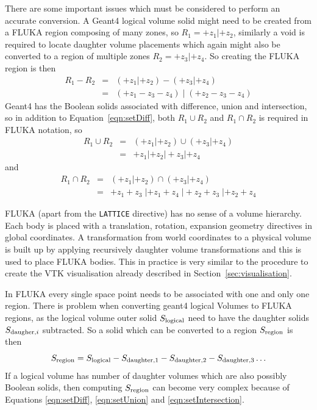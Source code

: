 \documentclass[final,5p,times,twocolumn]{elsarticle}
\newcommand{\fluka}[1]{\texttt{\MakeUppercase{#1}}}
\begin{document}
There are some important issues which must be considered to perform an accurate conversion. 
A Geant4 logical volume solid might need to be created from a FLUKA region composing of many zones, 
so $R_1 = +z_1 | +z_2$, similarly a void is required to locate daughter volume placements which again 
might also be converted to a region of multiple zones $R_2= +z_3 | +z_4$. So creating the FLUKA region is then 
\begin{eqnarray}
R_1 - R_2 	& = & (+z_1 | +z_2) - ( +z_3 | +z_4) 			\\
			& = & (+z_1 - z_3 - z_4) \;  | \; (+z_2 - z_3 - z_4)	
\label{eqn:setDiff}
\end{eqnarray}
Geant4 has the Boolean solids associated with difference, union and intersection, so in addition to 
Equation~\ref{eqn:setDiff}, both $R_1 \cup R_2$ and $R_1 \cap R_2$ is required in FLUKA notation, so 
\begin{eqnarray}
R_1 \cup R_2 	& = & (+z_1 | +z_2)  \cup ( +z_3 | +z_4) \\
			& = & +z_1 | +z_2 |  +z_3 | +z_4
\label{eqn:setUnion}
\end{eqnarray}
and 
\begin{eqnarray}
R_1 \cap R_2 	& = & (+z_1 | +z_2) \cap ( +z_3 | +z_4) \\
			& = & +z_1 +z_3  \; | +z_1 +z_4 \; | +z_2 +z_3 \; | +z_2 +z_4
\label{eqn:setIntersection}
\end{eqnarray}

FLUKA (apart from the \fluka{lattice} directive) has no sense of a volume hierarchy. Each body is placed with a 
translation, rotation, expansion geometry directives in global coordinates. A transformation from world 
coordinates to a physical volume is built up by applying recursively daughter volume transformations 
and  this is used to place FLUKA bodies. This  in practice is very similar to the procedure to create the 
VTK visualisation already described in Section~\ref{sec:visualisation}.

In FLUKA every single space point needs to be associated with one and only one region. There is problem 
when converting geant4 logical Volumes to FLUKA regions, as the logical volume outer solid $S_{\rm logical}$ 
need to have the daughter  solids $S_{{\rm daugher},i}$ subtracted. So a solid which can be converted 
to a region $S_{\rm region}$ is then 
\begin{equation}
S_{\rm region} =  S_{\rm logical} - S_{\rm daughter,1} - S_{\rm daughter,2} - S_{\rm daughter,3} \ldots 
\label{eqn:logicalSubtraction}
\end{equation} 
If a logical volume has  number of daughter volumes which are also possibly Boolean solids, then computing 
$S_{\rm region}$ can become very complex because of Equations \ref{eqn:setDiff}, \ref{eqn:setUnion} and 
\ref{eqn:setIntersection}. 
\end{document}
